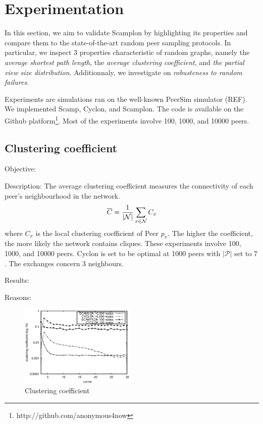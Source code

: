 
\section{Experimentation}
\label{sec:experiments}
In this section, we aim to validate Scamplon by highlighting its properties and
compare them to the state-of-the-art random peer sampling protocols. In
particular, we inspect 3 properties characteristic of random graphs, namely the
\emph{average shortest path length}, the \emph{average clustering coefficient},
and \emph{the partial view size distribution}. Additionnaly, we investigate on
\emph{robusteness to random failures}.

Experiments are simulations ran on the well-known PeerSim simulator (REF). We
implemented Scamp, Cyclon, and Scamplon. The code is available on the Github
platform\footnote{http://github.com/anonymous4now}. Most of the experiments
involve 100, 1000, and 10000 peers.

\subsection{Clustering coefficient}
\begin{asparadesc}
\item[Objective:]
\item[Description:] The average clustering coefficient measures the
  connectivity of each peer's neighbourhood in the network.
  \begin{equation}
    \overline{C} = {1\over |\mathcal{N}|}\sum\limits_{x\in\mathcal{N}}C_x
    \end{equation}
    where $C_x$ is the local clustering coefficient of Peer $p_x$. The higher
    the coefficient, the more likely the network contains cliques. These
    experiments involve 100, 1000, and 10000 peers. Cyclon is set to be optimal
    at 1000 peers with $|\mathcal{P}|$ set to $7$. The exchanges concern $3$
    neighbours.
\item[Results:]
\item[Reasons:]
\end{asparadesc}

\begin{figure}
    \centering
    \includegraphics[width=0.49\textwidth]{img/cluster.eps}
    \caption{Clustering coefficient}
    \label{fig:clustering}
\end{figure}

